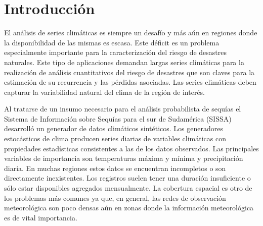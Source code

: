 \documentclass[
  12pt]{article}
\begin{document}
{
\setcounter{tocdepth}{3}
\tableofcontents
}
\hypertarget{introducciuxf3n}{%
\section{Introducción}\label{introducciuxf3n}}

El análisis de series climáticas es siempre un desafío y más aún en regiones donde la disponibilidad de las mismas es escasa. Este déficit es un problema especialmente importante para la caracterización del riesgo de desastres naturales. Este tipo de aplicaciones demandan largas series climáticas para la realización de análisis cuantitativos del riesgo de desastres que son claves para la estimación de su recurrencia y las pérdidas asociadas. Las series climáticas deben capturar la variabilidad natural del clima de la región de interés.

Al tratarse de un insumo necesario para el análisis probabilista de sequías el Sistema de Información sobre Sequías para el sur de Sudamérica (SISSA) desarrolló un generador de datos climáticos sintéticos. Los generadores estocásticos de clima producen series diarias de variables climáticas con propiedades estadísticas consistentes a las de los datos observados. Las principales variables de importancia son temperaturas máxima y mínima y precipitación diaria. En muchas regiones estos datos se encuentran incompletos o son directamente inexistentes. Los registros suelen tener una duración insuficiente o sólo estar disponibles agregados mensualmente. La cobertura espacial es otro de los problemas más comunes ya que, en general, las redes de observación meteorológica son poco densas aún en zonas donde la información meteorológica es de vital importancia.
\end{document}
